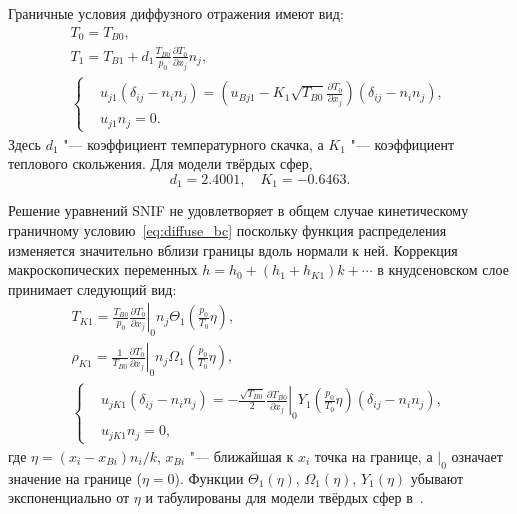 \documentclass[10pt]{article}
\newcommand{\pder}[2][]{\frac{\partial#1}{\partial#2}}
\begin{document}
Граничные условия диффузного отражения имеют вид:
\begin{gather}
    T_0 = T_{B0}, \label{eq:bc_T0} \\
    T_1 = T_{B1} + d_1\frac{T_{B0}}{p_0}\pder[T_0]{x_j} n_j, \label{eq:bc_T1} \\
    \left\{
    \begin{aligned}
        & u_{j1} (\delta_{ij}-n_in_j) =
            \left(u_{Bj1} - K_1 \sqrt{T_{B0}} \pder[T_0]{x_j}\right) (\delta_{ij}-n_in_j), \\
        & u_{j1} n_j = 0.
    \end{aligned}
    \right. \label{eq:bc_u1}
\end{gather}
Здесь \(d_1\) "--- коэффициент температурного скачка, а \(K_1\) "--- коэффициент теплового скольжения.
Для модели твёрдых сфер,
\begin{equation}\label{eq:slip_coefficients}
    d_1 = 2.4001, \quad K_1 = -0.6463.
\end{equation}

Решение уравнений SNIF не удовлетворяет в общем случае кинетическому граничному условию~\eqref{eq:diffuse_bc}
поскольку функция распределения изменяется значительно вблизи границы вдоль нормали к ней.
Коррекция макроскопических переменных \(h = h_0 + (h_1 + h_{K1})k + \cdots\) в кнудсеновском слое
принимает следующий вид:
\begin{gather}
    T_{K1} = \frac{T_{B0}}{p_0}\left.\pder[T_0]{x_j}\right|_0 n_j
        \Theta_1\left(\frac{p_0}{T_0}\eta\right), \label{eq:correction_T} \\
    \rho_{K1} = \frac1{T_{B0}}\left.\pder[T_0]{x_j}\right|_0 n_j
        \Omega_1\left(\frac{p_0}{T_0}\eta\right), \label{eq:correction_rho} \\
    \left\{
    \begin{aligned}
        & u_{jK1} (\delta_{ij}-n_in_j) =
            -\frac{\sqrt{T_{B0}}}2 \left.\pder[T_{B0}]{x_j}\right|_0
            Y_1\left(\frac{p_0}{T_0}\eta\right) (\delta_{ij}-n_in_j), \\
        & u_{jK1} n_j = 0,
    \end{aligned}
    \right. \label{eq:correction_u}
\end{gather}
где \(\eta = (x_i-x_{Bi})n_i/k\), \(x_{Bi}\) "--- ближайшая к \(x_i\) точка на границе,
а \(|_0\) означает значение на границе (\(\eta=0\)).
Функции \(\Theta_1(\eta)\), \(\Omega_1(\eta)\), \(Y_1(\eta)\) убывают экспоненциально от \(\eta\)
и табулированы для модели твёрдых сфер в~\cite{Sone2002, Sone2007}.
\end{document}
